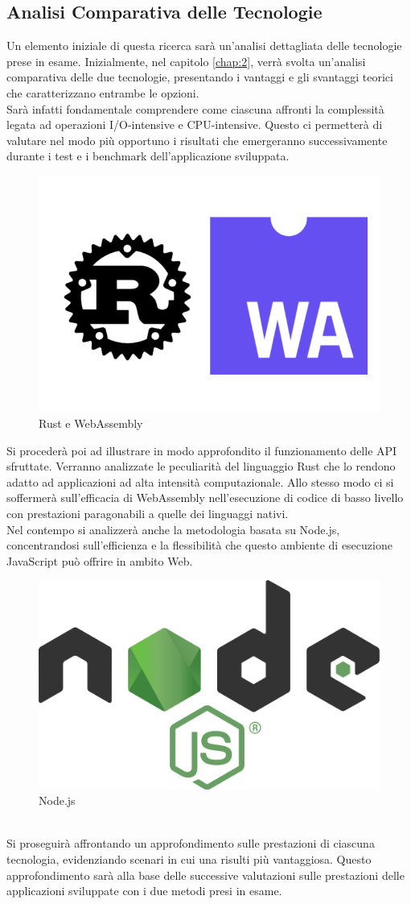 \subsection{Analisi Comparativa delle Tecnologie}
Un elemento iniziale di questa ricerca sarà un'analisi dettagliata delle tecnologie prese in esame. 
Inizialmente, nel capitolo \ref{chap:2}, verrà svolta un'analisi comparativa delle due tecnologie, presentando i vantaggi e gli svantaggi teorici che caratterizzano entrambe le opzioni.
\\Sarà infatti fondamentale comprendere come ciascuna affronti la complessità legata ad operazioni I/O-intensive e CPU-intensive. Questo ci permetterà di valutare nel modo più opportuno i risultati che emergeranno successivamente durante i test e i benchmark dell'applicazione sviluppata.
\begin{figure}
        \begin{center}
                \includegraphics[width=0.4\columnwidth]{images/rustwasm.jpg}
        \end{center}
        \caption{Rust e WebAssembly}
        \label{fig:rustwasm}
\end{figure}
\newpage
Si procederà poi ad illustrare in modo approfondito il funzionamento delle API sfruttate. Verranno analizzate le peculiarità del linguaggio Rust che lo rendono adatto ad applicazioni ad alta intensità computazionale. Allo stesso modo ci si soffermerà sull'efficacia di WebAssembly nell'esecuzione di codice di basso livello con prestazioni paragonabili a quelle dei linguaggi nativi.
\\Nel contempo si analizzerà anche la metodologia basata su Node.js, concentrandosi sull'efficienza e la flessibilità che questo ambiente di esecuzione JavaScript può offrire in ambito Web.
\begin{figure}
        \begin{center}
                \includegraphics[width=0.3\columnwidth]{images/node.png}
        \end{center}
        \caption{Node.js}
        \label{fig:nodejs}
\end{figure} 
\\Si proseguirà affrontando un approfondimento sulle prestazioni di ciascuna tecnologia, evidenziando scenari in cui una risulti più vantaggiosa. Questo approfondimento sarà alla base delle successive valutazioni sulle prestazioni delle applicazioni sviluppate con i due metodi presi in esame.

